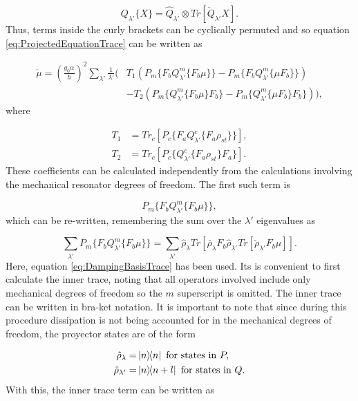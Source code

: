 \documentclass[12pt]{article}
\begin{document}
\begin{equation}\label{eq:DampingBasisTrace}
    Q_{\lambda'}\{X\} = \hat{Q}_{\lambda'}\otimes Tr[\check{Q}_{\lambda'}X].
\end{equation} Thus, terms inside the curly brackets can be cyclically permuted and so equation \eqref{eq:ProjectedEquationTrace} can be written as

\begin{align*}
    \dot{\mu} = (\frac{g_0 \alpha}{\hbar})^2 \sum_{\lambda'}\frac{1}{\lambda'}\Bigg(& T_1(P_m\{F_b Q^m_{\lambda'}\{F_b\mu\}\}-P_m\{F_b Q^m_{\lambda'}\{\mu F_b\}\})\\
    &-T_2(P_m\{Q^m_{\lambda'}\{F_b\mu\}F_b\}-P_m\{Q^m_{\lambda'}\{\mu F_b\}F_b\})\Bigg),
\end{align*} where

\begin{align}
    T_1 &= Tr_c[P_c\{F_a Q^c_{\lambda'}\{F_a \rho_{st}\}\}],\\
    T_2 &= Tr_c[P_c\{Q^c_{\lambda'}\{F_a \rho_{st}\}F_a \}].
\end{align} These coefficients can be calculated independently from the calculations involving the mechanical resonator degrees of freedom. The first such term is

$$
    P_m\{F_b Q^m_{\lambda'}\{F_b\mu\}\},
$$
which can be re-written, remembering the sum over the $\lambda'$ eigenvalues as

\begin{equation}
  \sum_{\lambda'}  P_m\{F_b Q^m_{\lambda'}\{F_b\mu\}\} = \sum_{\lambda'} \hat{\rho}_\lambda Tr[\check{\rho_\lambda} F_b \hat{\rho}_{\lambda'}Tr[\check{\rho}_{\lambda'}F_b \mu] ].
\end{equation} Here, equation \eqref{eq:DampingBasisTrace} has been used. Its is convenient to first calculate the inner trace, noting that all operators involved include only mechanical degrees of freedom so the $m$ superscript is omitted. The inner trace can be written in bra-ket notation. It is important to note that since during this procedure dissipation is not being accounted for in the mechanical degrees of freedom, the proyector states are of the form

\begin{align}
    \hat{\rho}_\lambda =& \ketbra{n}{n}\text{ for states in } P,\\
    \hat{\rho}_{\lambda'} =& \ketbra{n}{n+l}\text{ for states in } Q.
\end{align} With this, the inner trace term can be written as
\end{document}
